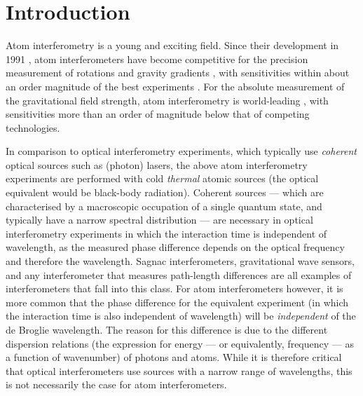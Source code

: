 \chapter{Introduction}
\label{Introduction}
\graphicspath{{Figures/Introduction/}{Figures/Common/}}


Atom interferometry is a young and exciting field.  Since their development in 1991 \citep{Carnal:1991,Keith:1991,Riehle:1991,Kasevich:1991}, atom interferometers have become competitive for the precision measurement of rotations \citep{McGuirk:2002} and gravity gradients \citep{Gustavson:2000}, with sensitivities within about an order magnitude of the best experiments \citep{Schreiber:2008,Moody:1993,Kann:1994}.  For the absolute measurement of the gravitational field strength, atom interferometry is world-leading \citep{Muller:2008}, with sensitivities more than an order of magnitude below that of competing technologies.

In comparison to optical interferometry experiments, which typically use \emph{coherent} optical sources such as (photon) lasers, the above atom interferometry experiments are performed with cold \emph{thermal} atomic sources (the optical equivalent would be black-body radiation).  Coherent sources --- which are characterised by a macroscopic occupation of a single quantum state, and typically have a narrow spectral distribution --- are necessary in optical interferometry experiments in which the interaction time is independent of wavelength, as the measured phase difference depends on the optical frequency and therefore the wavelength.  Sagnac interferometers, gravitational wave sensors, and any interferometer that measures path-length differences are all examples of interferometers that fall into this class.  For atom interferometers however, it is more common that the phase difference for the equivalent experiment (in which the interaction time is also independent of wavelength) will be \emph{independent} of the de Broglie wavelength.  The reason for this difference is due to the different dispersion relations (the expression for energy --- or equivalently, frequency --- as a function of wavenumber) of photons and atoms.  While it is therefore critical that optical interferometers use sources with a narrow range of wavelengths, this is not necessarily the case for atom interferometers.

